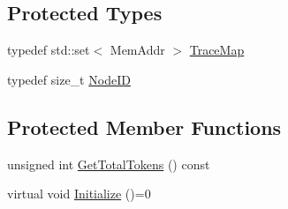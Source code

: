 \subsection*{Protected Types}
\begin{DoxyCompactItemize}
\item 
typedef std\+::set$<$ Mem\+Addr $>$ \hyperlink{class_simulator_1_1_c_d_m_a_ace88d950567607d699d7ad9e9cbbb3ef}{Trace\+Map}
\item 
typedef size\+\_\+t \hyperlink{class_simulator_1_1_c_d_m_a_a59272166fd32e642f3113c22cc756927}{Node\+I\+D}
\end{DoxyCompactItemize}
\subsection*{Protected Member Functions}
\begin{DoxyCompactItemize}
\item 
unsigned int \hyperlink{class_simulator_1_1_c_d_m_a_af0b28dfa9bfbdfc8065d421174f1e8bc}{Get\+Total\+Tokens} () const 
\item 
virtual void \hyperlink{class_simulator_1_1_c_d_m_a_ab0b1f08a4466de3ccce7445c9bcf7c6b}{Initialize} ()=0
\end{DoxyCompactItemize}
